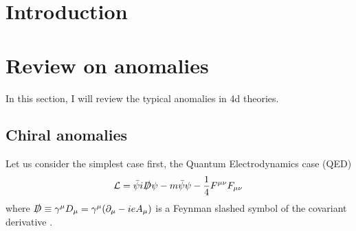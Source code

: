 \documentclass[a4paper,pdftex,10pt]{article}
\begin{document}
\maketitle

\tableofcontents

\clearpage
\section{Introduction}





\clearpage
\section{Review on anomalies}


In this section, I will review the typical anomalies in 4d theories.


\subsection{Chiral anomalies}

Let us consider the simplest case first, the Quantum Electrodynamics case (QED)
\begin{equation}
  \mathcal{L}
  =
  \bar{\psi}i\slashed{D}\psi
  -
  m\bar{\psi}\psi
  -
  \frac{1}{4}F^{\mu\nu}F_{\mu\nu}
\end{equation}
where $\slashed{D}\equiv\gamma^{\mu}D_{\mu}=\gamma^{\mu}(\partial_{\mu}-ieA_{\mu})$ is a Feynman slashed symbol of the covariant derivative .









\clearpage



\nocite{Arkani-Hamed:2001uol}

\end{document}
